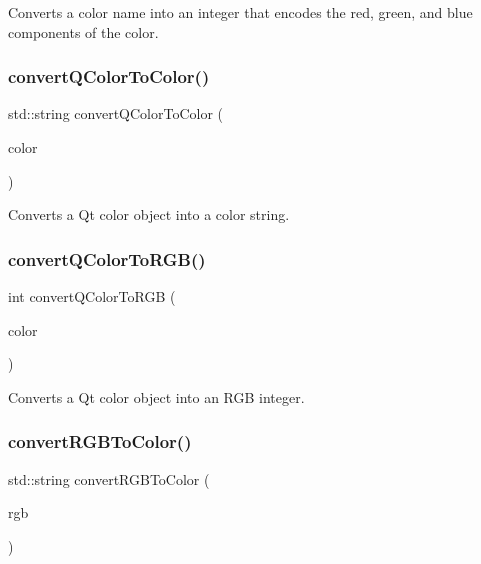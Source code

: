 Converts a color name into an integer that encodes the red, green, and blue components of the color. 

\mbox{\label{classGColor_a2ad78585a77dad65eb23299714545f7c}} 
\subsubsection{\texorpdfstring{convert\+Q\+Color\+To\+Color()}{convertQColorToColor()}}
{\footnotesize\ttfamily std\+::string convert\+Q\+Color\+To\+Color (\begin{DoxyParamCaption}\item[{const Q\+Color \&}]{color }\end{DoxyParamCaption})\hspace{0.3cm}{\ttfamily [static]}}



Converts a Qt color object into a color string. 

\mbox{\label{classGColor_a30f06933a10f00500d6b7991f8b61dde}} 
\subsubsection{\texorpdfstring{convert\+Q\+Color\+To\+R\+G\+B()}{convertQColorToRGB()}}
{\footnotesize\ttfamily int convert\+Q\+Color\+To\+R\+GB (\begin{DoxyParamCaption}\item[{const Q\+Color \&}]{color }\end{DoxyParamCaption})\hspace{0.3cm}{\ttfamily [static]}}



Converts a Qt color object into an R\+GB integer. 

\mbox{\label{classGColor_a64353dd79967412aeebe46219e4a71df}} 
\subsubsection{\texorpdfstring{convert\+R\+G\+B\+To\+Color()}{convertRGBToColor()}\hspace{0.1cm}{\footnotesize\ttfamily [1/2]}}
{\footnotesize\ttfamily std\+::string convert\+R\+G\+B\+To\+Color (\begin{DoxyParamCaption}\item[{int}]{rgb }\end{DoxyParamCaption})\hspace{0.3cm}{\ttfamily [static]}}




